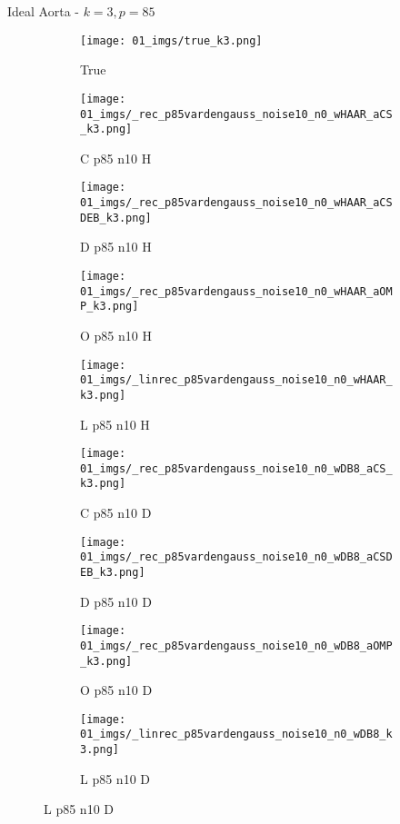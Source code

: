 \begin{frame}{Ideal Aorta - $k=3,p=85$}{}
\begin{figure}
\begin{subfigure}{0.1\textwidth}
\texttt{[image: 01\_imgs/true\_k3.png]}
\caption*{\Tiny True}
\end{subfigure}
\begin{subfigure}{0.1\textwidth}
\texttt{[image: 01\_imgs/\_rec\_p85vardengauss\_noise10\_n0\_wHAAR\_aCS\_k3.png]}
\caption*{\Tiny C p85 n10 H}
\end{subfigure}
\begin{subfigure}{0.1\textwidth}
\texttt{[image: 01\_imgs/\_rec\_p85vardengauss\_noise10\_n0\_wHAAR\_aCSDEB\_k3.png]}
\caption*{\Tiny D p85 n10 H}
\end{subfigure}
\begin{subfigure}{0.1\textwidth}
\texttt{[image: 01\_imgs/\_rec\_p85vardengauss\_noise10\_n0\_wHAAR\_aOMP\_k3.png]}
\caption*{\Tiny O p85 n10 H}
\end{subfigure}
\begin{subfigure}{0.1\textwidth}
\texttt{[image: 01\_imgs/\_linrec\_p85vardengauss\_noise10\_n0\_wHAAR\_k3.png]}
\caption*{\Tiny L p85 n10 H}
\end{subfigure}
\begin{subfigure}{0.1\textwidth}
\texttt{[image: 01\_imgs/\_rec\_p85vardengauss\_noise10\_n0\_wDB8\_aCS\_k3.png]}
\caption*{\Tiny C p85 n10 D}
\end{subfigure}
\begin{subfigure}{0.1\textwidth}
\texttt{[image: 01\_imgs/\_rec\_p85vardengauss\_noise10\_n0\_wDB8\_aCSDEB\_k3.png]}
\caption*{\Tiny D p85 n10 D}
\end{subfigure}
\begin{subfigure}{0.1\textwidth}
\texttt{[image: 01\_imgs/\_rec\_p85vardengauss\_noise10\_n0\_wDB8\_aOMP\_k3.png]}
\caption*{\Tiny O p85 n10 D}
\end{subfigure}
\begin{subfigure}{0.1\textwidth}
\texttt{[image: 01\_imgs/\_linrec\_p85vardengauss\_noise10\_n0\_wDB8\_k3.png]}
\caption*{\Tiny L p85 n10 D}
\end{subfigure}

\vspace{5pt}


\end{figure}
\end{frame}
